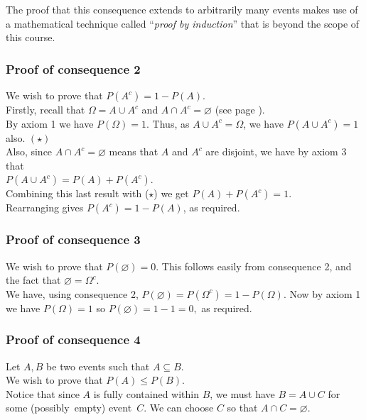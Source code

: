 	\noindent The proof that this consequence extends to arbitrarily many events makes use of a mathematical 
	technique called ``\textit{proof by induction}'' that is beyond the scope of this course.
	
	
	\subsubsection*{Proof of consequence 2}
	We wish to prove that $P(A^c) = 1 - P(A)$. \\
	
	\noindent Firstly, recall that $\Omega = A \cup A^c$ and $A \cap A^c = \varnothing$ (see page 
	\pageref{distributive law}). \\
	
	\noindent By axiom 1 we have $P(\Omega) = 1$. Thus, as $A \cup A^c = \Omega$, we have $P(A \cup A^c) = 1$ 
	also.  $(\star)$ \\
	
	\noindent Also, since $A \cap A^c = \varnothing$ means that $A$ and $A^c$ are disjoint, we have by axiom 3 that 
	\\ $P(A \cup A^c) = P(A) + P(A^c)$. \\
	
	\noindent Combining this last result with ($\star$) we get $P(A) + P(A^c) = 1$. \\ Rearranging gives $P(A^c) = 1 - 
	P(A)$, as required.
	
	\subsubsection*{Proof of consequence 3}
	We wish to prove that $P(\varnothing) = 0$. This follows easily from consequence 2, and the fact that $\varnothing 
	= \Omega^c$. \\
	
	We have, using consequence 2, $P(\varnothing) = P( \Omega^c) = 1 - P(\Omega).$ Now by axiom 1 we have 
	$P(\Omega) = 1$ so $P(\varnothing) = 1 - 1 = 0,$ as required.
	
	\subsubsection*{Proof of consequence 4}
	Let $A,B$ be two events such that $A \subseteq B.$ \\
	
	\noindent We wish to prove that $P(A) \leq P(B)$. \\
	
	
	\noindent Notice that since $A$ is fully contained within $B$, we must have $B = A \cup C$ for some 
	(possibly~empty) event~$C$. We can choose $C$ so that $A \cap C = \varnothing$. \\
	
